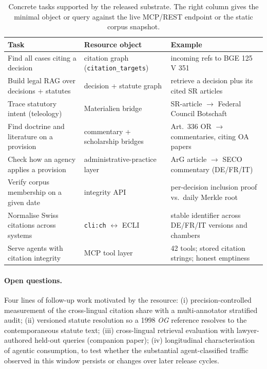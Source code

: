 \documentclass[11pt,a4paper]{article}
\begin{document}
\begin{table}[H]
\centering
\caption{Concrete tasks supported by the released substrate. The right column gives the minimal object or query against the live MCP/REST endpoint or the static corpus snapshot.}
\label{tab:reuse}
\small
\begin{tabular}{L{0.32\textwidth} L{0.26\textwidth} L{0.34\textwidth}}
\toprule
\textbf{Task} & \textbf{Resource object} & \textbf{Example} \\
\midrule
Find all cases citing a decision           & citation graph (\texttt{citation\_targets}) & incoming refs to BGE 125 V 351 \\
Build legal RAG over decisions + statutes  & decision + statute graph                    & retrieve a decision plus its cited SR articles \\
Trace statutory intent (teleology)         & Materialien bridge                          & SR-article $\to$ Federal Council Botschaft \\
Find doctrine and literature on a provision & commentary + scholarship bridges           & Art.~336 OR $\to$ commentaries, citing OA papers \\
Check how an agency applies a provision    & administrative-practice layer               & ArG article $\to$ SECO commentary (DE/FR/IT) \\
Verify corpus membership on a given date   & integrity API                               & per-decision inclusion proof vs.\ daily Merkle root \\
Normalise Swiss citations across systems   & \texttt{cli:ch} $\leftrightarrow$ ECLI       & stable identifier across DE/FR/IT versions and chambers \\
Serve agents with citation integrity       & MCP tool layer                              & 42 tools; stored citation strings; honest emptiness \\
\bottomrule
\end{tabular}
\end{table}

\paragraph{Open questions.} Four lines of follow-up work motivated by the resource: (i) precision-controlled measurement of the cross-lingual citation share with a multi-annotator stratified audit; (ii) versioned statute resolution so a 1998 \emph{OG} reference resolves to the contemporaneous statute text; (iii) cross-lingual retrieval evaluation with lawyer-authored held-out queries (companion paper); (iv) longitudinal characterisation of agentic consumption, to test whether the substantial agent-classified traffic observed in this window persists or changes over later release cycles.
\end{document}
